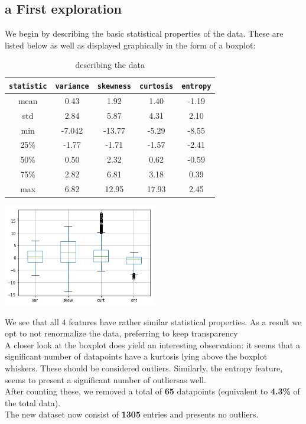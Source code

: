 \documentclass[14pt]{article}
\theoremstyle{plain}
\theoremstyle{definition}
\begin{document}
\subsection{a First exploration}
We begin by describing the basic statistical properties of the data. These are listed below as well as displayed graphically in the form of a boxplot:
\begin{table}[ht]
\begin{minipage}[b]{0.56\linewidth}
\centering
\begin{tabular}{|c| c| c |c |c|}
\hline
\texttt{statistic} & \texttt{variance} &\texttt{skewness}&\texttt{curtosis}  &\texttt{entropy} \\
	\hline
         mean &    0.43 &   1.92 &   1.40  & -1.19\\
         \hline
         std  &    2.84  &   5.87  &   4.31   &  2.10\\
         \hline
         min  &    -7.042 & -13.77  & -5.29    & -8.55\\
         \hline
         25\% &   -1.77  &  -1.71  &   -1.57  & -2.41\\
         \hline
         50\% &   0.50 &  2.32   &  0.62    &  -0.59\\
         \hline
         75\% &   2.82   &  6.81   &  3.18    &  0.39\\
         \hline
         max  &    6.82  &  12.95  &  17.93   &  2.45\\
         \hline
 \end{tabular}   
 \caption{describing the data}
    \label{table:student}
\end{minipage}\hfill
\begin{minipage}[b]{0.4\linewidth}
\centering
\includegraphics[width=67mm]{banknote_forgery_files/banknote_forgery_9_0}
\label{boxplot}
\end{minipage}
\end{table}

\noindent We see that all $4$ features have rather similar statistical properties. As a result we opt to not renormalize the data, preferring to keep transparency\\ 
A closer look at the boxplot does yield an interesting observation: it seems that a significant number of datapoints have a kurtosis lying above the boxplot whiskers. These should be considered outliers. Similarly, the entropy feature, seems to present a significant number of outliersas well.\\ After counting these, we removed a total of {\bf 65} datapoints (equivalent to {\bf 4.3\%} of the total data).\\ 
The new dataset now consist of {\bf 1305} entries and presents no outliers.
\end{document}
